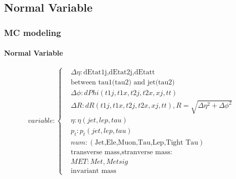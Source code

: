 \documentclass[usenames,dvipsnames]{beamer}
\begin{document}
\subsection{Normal Variable}
\begin{frame}
	\frametitle{MC modeling}
	\framesubtitle{Normal Variable}
\begin{equation*}
	variable:\left\{
	\begin{split}
		&\Delta\eta:\text{dEtat1j,dEtat2j,dEtatt}\\ 
		&\text{between tau1(tau2) and jet(tau2)}\\
		&\Delta\phi:dPhi(t1j,t1x,t2j,t2x,xj,tt)\\
		&\Delta R:dR(t1j,t1x,t2j,t2x,xj,tt),R = \sqrt{\Delta\eta^2 + \Delta\phi^2}\\
		&\eta:\eta(jet,lep,tau)\\
		&p_t:p_t(jet,lep,tau)\\
		&num:(\text{Jet,Ele,Muon,Tau,Lep,Tight Tau})\\
		&\text{transverse mass,stranverse mass:}\\
		&MET:Met, Metsig\\
		&\text{invariant mass}
	\end{split}
	\right.
\end{equation*}
\end{frame}
\end{document}

